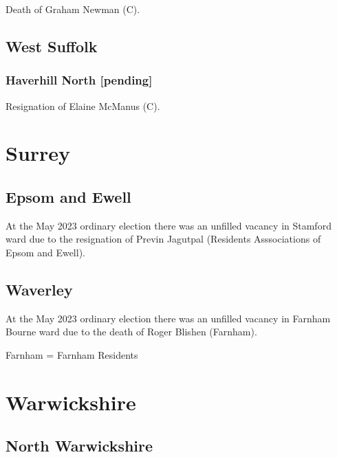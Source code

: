 \documentclass[a4paper,openany]{book}
\begin{document}
\begin{resultsiii}
Death of Graham Newman (C).

\subsection*{West Suffolk}

\subsubsection*{Haverhill North \hspace*{\fill}\nolinebreak[1]%
	\enspace\hspace*{\fill}
	[pending]}


Resignation of Elaine McManus (C).

\section{Surrey}

\subsection*{Epsom and Ewell}

At the May 2023 ordinary election there was an unfilled vacancy in Stamford ward due to the resignation of Previn Jagutpal (Residents Asssociations of Epsom and Ewell).%

\subsection*{Waverley}

At the May 2023 ordinary election there was an unfilled vacancy in Farnham Bourne ward due to the death of Roger Blishen (Farnham).%

Farnham = Farnham Residents

\section{Warwickshire}

\subsection*{North Warwickshire}


\end{resultsiii}
\end{document}
